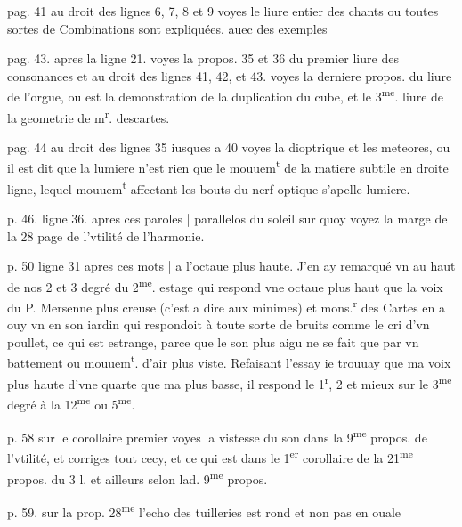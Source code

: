 \documentclass[11pt,a4paper]{article}
\begin{document}
pag. 41 au droit des lignes 6, 7, 8 et 9
voyes le liure entier des chants ou toutes sortes de Combinations sont expliquées, auec des exemples

pag. 43. apres la ligne 21.
voyes la propos. 35 et 36 du premier liure des consonances
et au droit des lignes 41, 42, et 43.
voyes la derniere propos. du liure de l'orgue, ou est la demonstration de la duplication du cube, et le 3\textsuperscript{me}. liure de la geometrie de m\textsuperscript{r}. descartes.

pag. 44 \struck{\ill{}} au droit des lignes 35 iusques a 40
voyes la dioptrique et les meteores, ou il est dit que la lumiere n'est rien que le mouuem\textsuperscript{t} de la matiere subtile en droite ligne, lequel mouuem\textsuperscript{t} affectant les bouts du nerf optique s'apelle lumiere.

p. 46. ligne 36. apres ces paroles | parallelos du soleil
sur quoy voyez la marge de la 28 page de l'vtilité de l'harmonie.

p. 50 ligne 31 apres ces mots | a l'octaue plus haute.
J'en ay remarqué vn au haut de nos 2 et 3 degré du 2\textsuperscript{me}. estage qui respond vne octaue plus haut que la voix du P. Mersenne plus creuse (c'est a dire aux minimes) et mons.\textsuperscript{r} des Cartes en a ouy vn en son iardin qui respondoit à toute sorte de bruits comme le cri d'vn poullet, ce qui est estrange, parce que le son plus aigu ne se fait que par vn battement ou mouuem\textsuperscript{t}. d'air plus viste. Refaisant l'essay ie trouuay que ma voix plus haute d'vne quarte que ma plus basse, il respond \quad le 1\textsuperscript{r}, 2 et mieux sur le 3\textsuperscript{me} degré à la 12\textsuperscript{me} ou 5\textsuperscript{me}.

p. 58 sur le corollaire premier
voyes la vistesse du son dans la 9\textsuperscript{me} propos. de l'vtilité, et corriges tout cecy, et ce qui est dans le 1\textsuperscript{er} corollaire de la 21\textsuperscript{me} propos. du 3 l. et ailleurs selon lad. 9\textsuperscript{me} propos.

p. 59. sur la prop. 28\textsuperscript{me}
l'echo des tuilleries est rond et non pas en ouale
\end{document}
